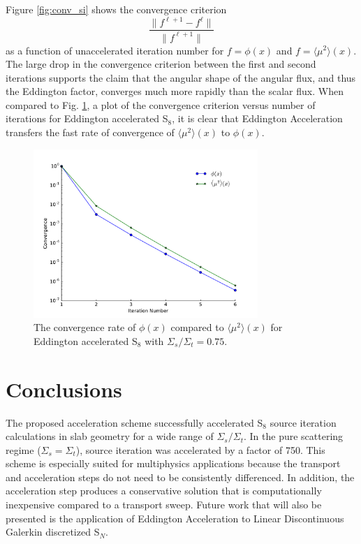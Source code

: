 \documentclass{anstrans}
\newcommand{\SN}{S$_N$\xspace}
\newcommand{\edd}{\langle \mu^2 \rangle}
\begin{document}
	Figure \ref{fig:conv_si} shows the convergence criterion 
		\begin{equation}
			\frac{\|f^{\ell+1} - f^{\ell}\|}{\|f^{\ell+1}\|}
		\end{equation}
	as a function of unaccelerated iteration number for $f = \phi(x)$ and $f = \edd(x)$. The large drop in the convergence criterion between the first and second iterations supports the claim that the angular shape of the angular flux, and thus the Eddington factor, converges much more rapidly than the scalar flux. When compared to Fig. \ref{fig:conv_edd}, a plot of the convergence criterion versus number of iterations for Eddington accelerated S$_8$, it is clear that Eddington Acceleration transfers the fast rate of convergence of $\edd(x)$ to $\phi(x)$. 

	\begin{figure}
		\centering
		\includegraphics[width=8.5cm]{figs/eddCon_mu.pdf}
		\caption{The convergence rate of $\phi(x)$ compared to $\edd(x)$ for Eddington accelerated S$_8$ with $\Sigma_s/\Sigma_t = 0.75$. }
		\label{fig:conv_edd}
	\end{figure}


\section{Conclusions}
	The proposed acceleration scheme successfully accelerated S$_8$ source iteration calculations in slab geometry for a wide range of $\Sigma_s/\Sigma_t$. In the pure scattering regime ($\Sigma_s = \Sigma_t$), source iteration was accelerated by a factor of 750. This scheme is especially suited for multiphysics applications because the transport and acceleration steps do not need to be consistently differenced. In addition, the acceleration step produces a conservative solution that is computationally inexpensive compared to a transport sweep. Future work that will also be presented is the application of Eddington Acceleration to Linear Discontinuous Galerkin discretized \SN. 




\end{document}
